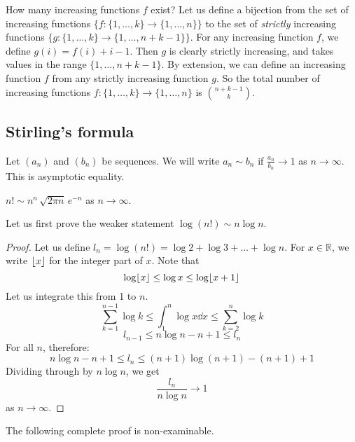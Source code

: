 How many increasing functions \(f\) exist?
Let us define a bijection from the set of increasing functions \(\{f\colon \{1, \dots, k\} \to \{1, \dots, n\}\}\) to the set of \textit{strictly} increasing functions \(\{g\colon \{1, \dots, k\} \to \{1, \dots, n+k-1\}\}\).
For any increasing function \(f\), we define \(g(i) = f(i) + i - 1\).
Then \(g\) is clearly strictly increasing, and takes values in the range \(\{1, \dots, n+k-1\}\).
By extension, we can define an increasing function \(f\) from any strictly increasing function \(g\).
So the total number of increasing functions \(f\colon \{1, \dots, k\} \to \{1, \dots, n\}\) is \(\binom{n+k-1}{k}\).

\subsection{Stirling's formula}
Let \((a_n)\) and \((b_n)\) be sequences.
We will write \(a_n \sim b_n\) if \(\frac{a_n}{b_n} \to 1\) as \(n \to \infty\).
This is asymptotic equality.
\begin{theorem}
	\(n!
	\sim n^n\, \sqrt{2 \pi n}\, e^{-n}\) as \(n \to \infty\).
\end{theorem}
Let us first prove the weaker statement \(\log (n!) \sim n \log n\).
\begin{proof}
	Let us define \(l_n = \log (n!) = \log 2 + \log 3 + \dots + \log n\).
	For \(x \in \mathbb R\), we write \(\floor*{x}\) for the integer part of \(x\).
	Note that
	\[
		\log \floor* x \leq \log x \leq \log \floor*{x+1}
	\]
	Let us integrate this from 1 to \(n\).
	\[
		\sum_{k=1}^{n-1} \log k \leq \int_1^n \log x\dd{x} \leq \sum_{k=2}^{n} \log k
	\]
	\[
		l_{n-1} \leq n \log n - n + 1 \leq l_n
	\]
	For all \(n\), therefore:
	\[
		n \log n - n + 1 \leq l_n \leq (n+1) \log (n+1) - (n+1) + 1
	\]
	Dividing through by \(n\log n\), we get
	\[
		\frac{l_n}{n \log n} \to 1
	\]
	as \(n \to \infty\).
\end{proof}
The following complete proof is non-examinable.
